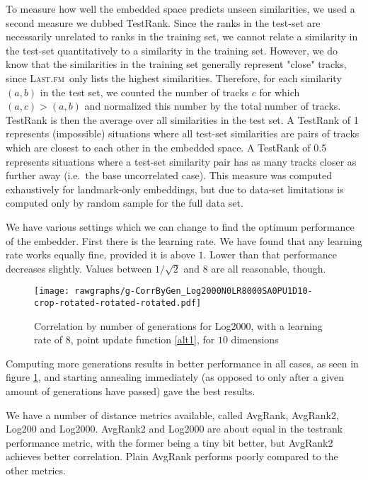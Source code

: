 \documentclass[10pt,fleqn,a4paper]{article}
\newcommand{\lastfm}{\textsc{Last.fm}}
\begin{document}
\begin{twocolumn}
To measure how well the embedded space predicts unseen similarities, we used a second measure we dubbed TestRank.  Since the ranks in the test-set are necessarily unrelated to ranks in the training set, we cannot relate a similarity in the test-set quantitatively to a similarity in the training set.  However, we do know that the similarities in the training set generally represent "close" tracks, since \lastfm~only lists the highest similarities.  Therefore, for each similarity $(a,b)$ in the test set, we counted the number of tracks $c$ for which $(a,c) > (a,b)$ and normalized this number by the total number of tracks.  TestRank is then the average over all similarities in the test set.  A TestRank of 1 represents (impossible) situations where all test-set similarities are pairs of tracks which are closest to each other in the embedded space.  A TestRank of 0.5 represents situations where a test-set similarity pair has as many tracks closer as further away (i.e.\ the base uncorrelated case). This measure was computed exhaustively for landmark-only embeddings, but due to data-set limitations is computed only by random sample for the full data set.

We have various settings which we can change to find the optimum performance of the embedder. First there is the learning rate. We have found that any learning rate works equally fine, provided it is above $1$. Lower than that performance decreases slightly. Values between $1/\sqrt{2}$ and 8 are all reasonable, though.

\begin{figure}
\begin{center}\texttt{[image: rawgraphs/g-CorrByGen\_Log2000N0LR8000SA0PU1D10-crop-rotated-rotated-rotated.pdf]}\end{center}
    \caption{Correlation by number of generations for Log2000, with a learning rate of 8, point update function \ref{alt1}, for $10$ dimensions}
    \label{corrbygen-log2000}
\end{figure}

Computing more generations results in better performance in all cases, as seen in figure \ref{corrbygen-log2000}, and starting annealing immediately (as opposed to only after a given amount of generations have passed) gave the best results.

We have a number of distance metrics available, called AvgRank, AvgRank2, Log200 and Log2000. AvgRank2 and Log2000 are about equal in the testrank performance metric, with the former being a tiny bit better, but AvgRank2 achieves better correlation. Plain AvgRank performs poorly compared to the other metrics.


\end{twocolumn}
\end{document}

